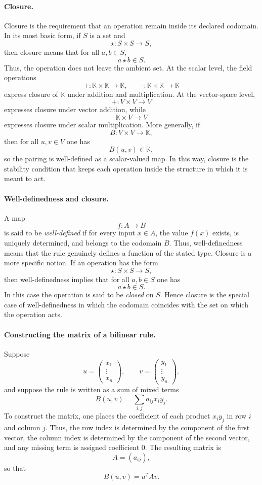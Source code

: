 \documentclass{article}
\begin{document}
	\paragraph{Closure.}
	Closure is the requirement that an operation remain inside its declared codomain. In its most basic form, if $S$ is a set and
	$$
	\star:S\times S\to S,
	$$
	then closure means that for all $a,b\in S$,
	$$
	a\star b\in S.
	$$
	Thus, the operation does not leave the ambient set. At the scalar level, the field operations
	$$
	+:\mathbb{K}\times\mathbb{K}\to\mathbb{K},
	\qquad
	\cdot:\mathbb{K}\times\mathbb{K}\to\mathbb{K}
	$$
	express closure of $\mathbb{K}$ under addition and multiplication. At the vector-space level,
	$$
	+:V\times V\to V
	$$
	expresses closure under vector addition, while
	$$
	\mathbb{K}\times V\to V
	$$
	expresses closure under scalar multiplication. More generally, if
	$$
	B:V\times V\to\mathbb{K},
	$$
	then for all $u,v\in V$ one has
	$$
	B(u,v)\in\mathbb{K},
	$$
	so the pairing is well-defined as a scalar-valued map. In this way, closure is the stability condition that keeps each operation inside the structure in which it is meant to act.
	
	\paragraph{Well-definedness and closure.}
	A map
	$$
	f:A\to B
	$$
	is said to be \emph{well-defined} if for every input $x\in A$, the value $f(x)$ exists, is uniquely determined, and belongs to the codomain $B$. Thus, well-definedness means that the rule genuinely defines a function of the stated type. Closure is a more specific notion. If an operation has the form
	$$
	\star:S\times S\to S,
	$$
	then well-definedness implies that for all $a,b\in S$ one has
	$$
	a\star b\in S.
	$$
	In this case the operation is said to be \emph{closed} on $S$. Hence closure is the special case of well-definedness in which the codomain coincides with the set on which the operation acts.
	
	\paragraph{Constructing the matrix of a bilinear rule.}
	Suppose
	$$
	u=\begin{pmatrix}x_1\\ \vdots \\ x_n\end{pmatrix},
	\qquad
	v=\begin{pmatrix}y_1\\ \vdots \\ y_n\end{pmatrix},
	$$
	and suppose the rule is written as a sum of mixed terms
	$$
	B(u,v)=\sum_{i,j} a_{ij}x_i y_j.
	$$
	To construct the matrix, one places the coefficient of each product $x_i y_j$ in row $i$ and column $j$. Thus, the row index is determined by the component of the first vector, the column index is determined by the component of the second vector, and any missing term is assigned coefficient $0$. The resulting matrix is
	$$
	A=(a_{ij}),
	$$
	so that
	$$
	B(u,v)=u^TAv.
	$$
	
\end{document}

